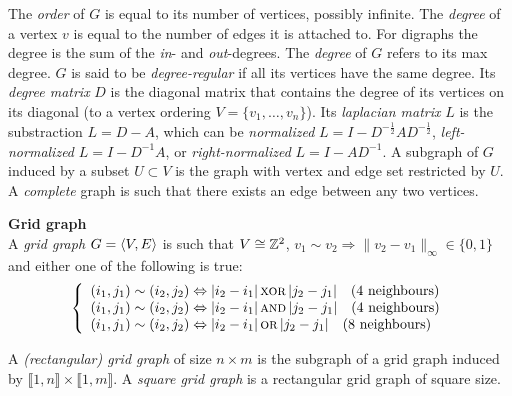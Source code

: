 The \emph{order} of $G$ is equal to its number of vertices, possibly infinite.
The \emph{degree} of a vertex $v$ is equal to the number of edges it is attached to.
For digraphs the degree is the sum of the \emph{in}- and \emph{out}-degrees.
The \emph{degree} of $G$ refers to its max degree.
$G$ is said to be \emph{degree-regular} if all its vertices have the same degree.
Its \emph{degree matrix} $D$ is the diagonal matrix that contains the degree of its vertices on its diagonal (\wrt to a vertex ordering $V = \{v_1, \ldots, v_n\}$).
Its \emph{laplacian matrix} $L$ is the substraction $L = D-A$, which can be \emph{normalized} $L = I - D^{-\frac{1}2}AD^{-\frac{1}2}$, \emph{left-normalized} $L = I - D^{-1}A$, or \emph{right-normalized} $L = I - AD^{-1}$.
A subgraph of $G$ induced by a subset $U \subset V$ is the graph with vertex and edge set restricted by $U$.
A \emph{complete} graph is such that there exists an edge between any two vertices.

\begin{definition}\textbf{Grid graph}\\
A \emph{grid graph} $G = \langle V, E \rangle$ is 
such that $V \cong \mathbb{Z}^2$, $v_1 \sim v_2 \Rightarrow \|v_2 -v_1\|_\infty \in \{0, 1\}$ and either one of the following is true:
\begin{gather*}
\left\{
  \begin{array}{l}
    (i_1,j_1) \sim (i_2,j_2) \Leftrightarrow |i_2 - i_1| \operatorname{\textsc{xor}} |j_2 - j_1| \quad \text{($4$ neighbours)}\\
    (i_1,j_1) \sim (i_2,j_2) \Leftrightarrow |i_2 - i_1| \operatorname{\textsc{and}} |j_2 - j_1| \quad \text{($4$ neighbours)}\\
    (i_1,j_1) \sim (i_2,j_2) \Leftrightarrow |i_2 - i_1| \operatorname{\textsc{or}} |j_2 - j_1| \quad \text{($8$ neighbours)}
  \end{array}
\right.
\end{gather*}

A \emph{(rectangular) grid graph} of size $n \times m$ is the subgraph of a grid graph induced by $\llbracket 1, n \rrbracket \times \llbracket 1, m \rrbracket$. A \emph{square grid graph} is a rectangular grid graph of square size.
\end{definition}


